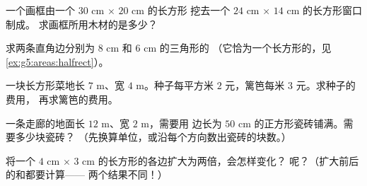 \begin{exercise}[$\star$]\label{exo:g5:areas:7}
一个画框由一个 $30$ cm $\times$ $20$ cm 的长方形
挖去一个 $24$ cm $\times$ $14$ cm 的长方形窗口制成。
求画框所用木材的是多少？
\end{exercise}

\begin{exercise}[$\star$]\label{exo:g5:areas:8}
求两条直角边分别为 $8$ cm 和 $6$ cm 的三角形的
（它恰为一个长方形的，见\cref{ex:g5:areas:halfrect}）。
\end{exercise}

\begin{exercise}[$\star$]\label{exo:g5:areas:9}
一块长方形菜地长 $7$ m、宽 $4$ m。种子每平方米
$2$ 元，篱笆每米 $3$ 元。求种子的费用，
再求篱笆的费用。
\end{exercise}

\begin{exercise}[$\star\star$]\label{exo:g5:areas:10}
一条走廊的地面长 $12$ m、宽 $2$ m，需要用
边长为 $50$ cm 的正方形瓷砖铺满。需要多少块瓷砖？
（先换算单位，或沿每个方向数出瓷砖的块数。）
\end{exercise}

\begin{exercise}[$\star\star$]\label{exo:g5:areas:11}
将一个 $4$ cm $\times$ $3$ cm 的长方形的各边扩大为两倍，会怎样变化？
呢？（扩大前后的和都要计算——
两个结果不同！）
\end{exercise}
